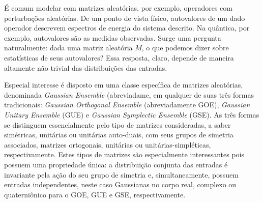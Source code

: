 \documentclass[12pt]{report}
\begin{document}

É comum modelar com matrizes aleatórias, por exemplo, operadores com perturbações aleatórias. De um ponto de vista físico, autovalores de um dado operador descrevem espectros de energia do sistema descrito. Na quântica, por exemplo, autovalores são as medidas observadas. Surge uma pergunta naturalmente: dada uma matriz aleatória $M$, o que podemos dizer sobre estatísticas de seus autovalores? Essa resposta, claro, depende de maneira altamente não trivial das distribuições das entradas.  


Especial interesse é disposto em uma classe específica de matrizes aleatórias, denominada \textit{Gaussian Ensemble} (abreviadame, em qualquer de suas três formas tradicionais:  \textit{Gaussian Orthogonal Ensemble} (abreviadamente GOE), \textit{Gaussian Unitary Ensemble} (GUE) e \textit{Gaussian Symplectic Ensemble} (GSE). As três formas se distinguem essencialmente pelo tipo de matrizes consideradas, a saber simétricas, unitárias ou unitárias auto-duais, com seus grupos de simetria associados, matrizes ortogonais, unitárias ou unitárias-simpléticas, respectivamente. Estes tipos de matrizes são especialmente interessantes pois possuem uma propriedade única: a distribuição conjunta das entradas é invariante pela ação do seu grupo de simetria e, simultaneamente, possuem entradas independentes, neste caso Gaussianas no corpo real, complexo ou quaterniônico para o GOE, GUE e GSE, respectivamente. 
\end{document}
